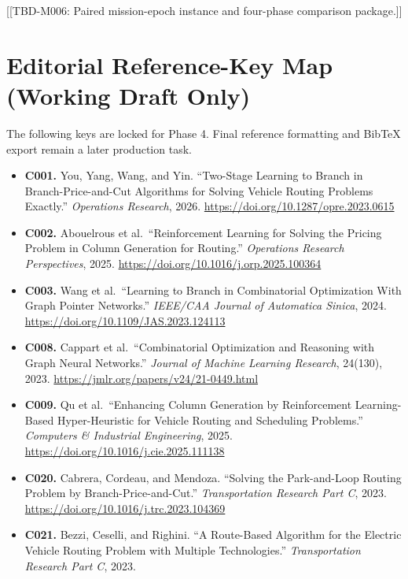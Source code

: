 \documentclass[
  11pt,
]{article}
\providecommand{\tightlist}{%
  \setlength{\itemsep}{0pt}\setlength{\parskip}{0pt}}
\begin{document}
{[}{[}TBD-M006: Paired mission-epoch instance and four-phase comparison
package.{]}{]}

\hypertarget{editorial-reference-key-map-working-draft-only}{%
\section{Editorial Reference-Key Map (Working Draft
Only)}\label{editorial-reference-key-map-working-draft-only}}

The following keys are locked for Phase 4. Final reference formatting
and BibTeX export remain a later production task.

\begin{itemize}
\tightlist
\item
  \textbf{C001.} You, Yang, Wang, and Yin. ``Two-Stage Learning to
  Branch in Branch-Price-and-Cut Algorithms for Solving Vehicle Routing
  Problems Exactly.'' \emph{Operations Research}, 2026.
  \url{https://doi.org/10.1287/opre.2023.0615}
\item
  \textbf{C002.} Abouelrous et al.~``Reinforcement Learning for Solving
  the Pricing Problem in Column Generation for Routing.''
  \emph{Operations Research Perspectives}, 2025.
  \url{https://doi.org/10.1016/j.orp.2025.100364}
\item
  \textbf{C003.} Wang et al.~``Learning to Branch in Combinatorial
  Optimization With Graph Pointer Networks.'' \emph{IEEE/CAA Journal of
  Automatica Sinica}, 2024.
  \url{https://doi.org/10.1109/JAS.2023.124113}
\item
  \textbf{C008.} Cappart et al.~``Combinatorial Optimization and
  Reasoning with Graph Neural Networks.'' \emph{Journal of Machine
  Learning Research}, 24(130), 2023.
  \url{https://jmlr.org/papers/v24/21-0449.html}
\item
  \textbf{C009.} Qu et al.~``Enhancing Column Generation by
  Reinforcement Learning-Based Hyper-Heuristic for Vehicle Routing and
  Scheduling Problems.'' \emph{Computers \& Industrial Engineering},
  2025. \url{https://doi.org/10.1016/j.cie.2025.111138}
\item
  \textbf{C020.} Cabrera, Cordeau, and Mendoza. ``Solving the
  Park-and-Loop Routing Problem by Branch-Price-and-Cut.''
  \emph{Transportation Research Part C}, 2023.
  \url{https://doi.org/10.1016/j.trc.2023.104369}
\item
  \textbf{C021.} Bezzi, Ceselli, and Righini. ``A Route-Based Algorithm
  for the Electric Vehicle Routing Problem with Multiple Technologies.''
  \emph{Transportation Research Part C}, 2023.

\end{itemize}
\end{document}
